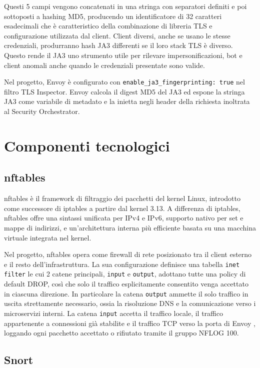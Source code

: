 Questi 5 campi vengono concatenati in una stringa con separatori definiti e poi sottoposti a hashing MD5, producendo un identificatore di 32 caratteri esadecimali che è caratteristico della combinazione di libreria TLS e configurazione utilizzata dal client. Client diversi, anche se usano le stesse credenziali, produrranno hash JA3 differenti se il loro stack TLS è diverso. Questo rende il JA3 uno strumento utile per rilevare impersonificazioni, bot e client anomali anche quando le credenziali presentate sono valide.

Nel progetto, Envoy è configurato con \texttt{enable\_ja3\_fingerprinting: true} nel filtro TLS Inspector. Envoy   calcola il digest MD5 del JA3 ed espone la stringa JA3  come variabile di metadato e la inietta negli header della richiesta inoltrata al Security Orchestrator.

\section{Componenti tecnologici}

\subsection{nftables}

nftables è il framework di filtraggio dei pacchetti del kernel Linux, introdotto come successore di iptables a partire dal kernel 3.13. A differenza di iptables, nftables offre una sintassi unificata per IPv4 e IPv6, supporto nativo per set e mappe di indirizzi, e un'architettura interna più efficiente basata su una macchina virtuale integrata nel kernel.

Nel progetto, nftables opera come firewall di rete posizionato tra il client esterno e il
  resto dell'infrastruttura. La sua configurazione definisce una tabella \texttt{inet filter} le
  cui 2 catene principali, \texttt{input} e \texttt{output}, adottano tutte
  una policy di default DROP, così che solo il traffico esplicitamente consentito venga
  accettato in ciascuna direzione. In particolare la catena \texttt{output} ammette il solo
  traffico in uscita strettamente necessario, ossia la risoluzione DNS e la comunicazione verso
  i microservizi interni. La catena \texttt{input} accetta il traffico locale, il traffico
  appartenente a connessioni già stabilite e il traffico TCP verso la porta di Envoy , loggando ogni pacchetto accettato o rifiutato
  tramite il gruppo NFLOG 100.

\subsection{Snort}

